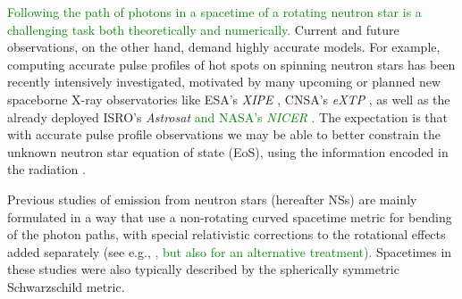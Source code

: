 \documentclass{aa}
\newcommand{\refe}[1]{\textcolor{green}{{#1}}}
\newcommand{\refedel}[1]{}
\newcommand{\sch}{Schwarzschild }
\begin{document}
\refe{Following the path of photons in a spacetime of a rotating neutron star is a challenging task both theoretically and numerically.}
Current and future observations, on the other hand, demand highly accurate models.
For example, computing accurate pulse profiles of hot spots on spinning neutron stars has been recently intensively investigated, motivated by many upcoming or planned new spaceborne X-ray observatories like ESA's \textit{XIPE} \citep{XIPE}, CNSA's \textit{eXTP} \citep{eXTP}, as well as the already deployed ISRO's \textit{Astrosat} \citep{Astrosat} \refe{and NASA's \textit{NICER} \citep{NICER}.}
The expectation is that with accurate pulse profile observations we may be able to better constrain the unknown neutron star equation of state (EoS), using the information encoded in the radiation \citep[see e.g.,][]{LMB13}.

Previous studies of emission from neutron stars (hereafter NSs) are mainly formulated in a way that use a non-rotating curved spacetime metric for bending of the photon paths, with special relativistic corrections to the rotational effects added separately\refedel{, in an ad-hoc manner} (see e.g.,\refe{ \citealt{PFC83,P95, ML98, WM01, PG03, PB06, Lamb09a, Lamb09b, LMB13, ML15}, but also \citealt{BR01} for \refe{an alternative} treatment).} 
Spacetimes in these studies were also typically described by the spherically symmetric \sch metric.
\end{document}
